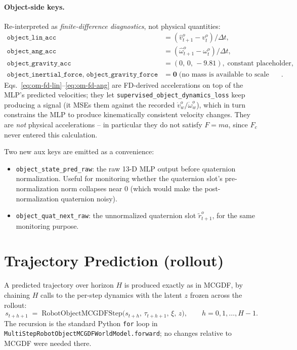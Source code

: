 \documentclass[11pt]{article}
\begin{document}
\paragraph{Object-side keys.}  Re-interpreted as
\emph{finite-difference diagnostics}, not physical quantities:
\begin{align}
  \texttt{object\_lin\_acc}
    &= (\hat v^o_{t+1} - v^o_t) / \Delta t,
    \label{eq:om-fd-lin}\\
  \texttt{object\_ang\_acc}
    &= (\hat \omega^o_{t+1} - \omega^o_t) / \Delta t,
    \label{eq:om-fd-ang}\\
  \texttt{object\_gravity\_acc}
    &= (0,\,0,\,-9.81),\;\text{constant placeholder},\\
  \texttt{object\_inertial\_force},\;
  \texttt{object\_gravity\_force}
    &= \mathbf{0}\;\text{(no mass is available to scale these)}.
\end{align}
Eqs.~\eqref{eq:om-fd-lin}--\eqref{eq:om-fd-ang} are FD-derived
accelerations on top of the MLP's predicted velocities; they let
\texttt{supervised\_object\_dynamics\_loss} keep producing a signal
(it MSEs them against the recorded $\dot v^o_w / \dot \omega^o_w$),
which in turn constrains the MLP to produce kinematically consistent
velocity changes.  They are \emph{not} physical accelerations -- in
particular they do not satisfy $F = m a$, since $F_c$ never entered
this calculation.

Two new aux keys are emitted as a convenience:
\begin{itemize}
  \item \texttt{object\_state\_pred\_raw}: the raw 13-D MLP output
    before quaternion normalization.  Useful for monitoring whether
    the quaternion slot's pre-normalization norm collapses near 0
    (which would make the post-normalization quaternion noisy).
  \item \texttt{object\_quat\_next\_raw}: the unnormalized quaternion
    slot \(\tilde r^o_{t+1}\), for the same monitoring purpose.
\end{itemize}

\section{Trajectory Prediction (rollout)}

A predicted trajectory over horizon $H$ is produced exactly as in
MCGDF, by chaining $H$ calls to the per-step dynamics with the latent
$z$ frozen across the rollout:
\begin{equation}
  s_{t+h+1} \;=\; \mathrm{RobotObjectMCGDFStep}\bigl(s_{t+h},\,\tau_{t+h+1},\,\xi,\,z\bigr),
  \qquad h = 0, 1, \dots, H-1.
  \label{eq:om-rollout}
\end{equation}
The recursion is the standard Python \texttt{for} loop in
\texttt{MultiStepRobotObjectMCGDFWorldModel.forward}; no changes
relative to MCGDF were needed there.
\end{document}
